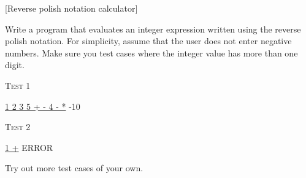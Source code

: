 [Reverse polish notation calculator]

Write a program that evaluates an integer expression written using the reverse polish
notation.
For simplicity, assume that the user does not enter negative numbers.
Make sure you test cases where the integer value has more than one digit.

\textsc{Test 1}
\begin{console}[commandchars=\\\{\},fontsize=\footnotesize]
\underline{1 2 3 5 + - 4 - *}
-10
\end{console}

\textsc{Test 2}
\begin{console}[commandchars=\\\{\},fontsize=\footnotesize]
\underline{1 +}
ERROR
\end{console}

Try out more test cases of your own.



